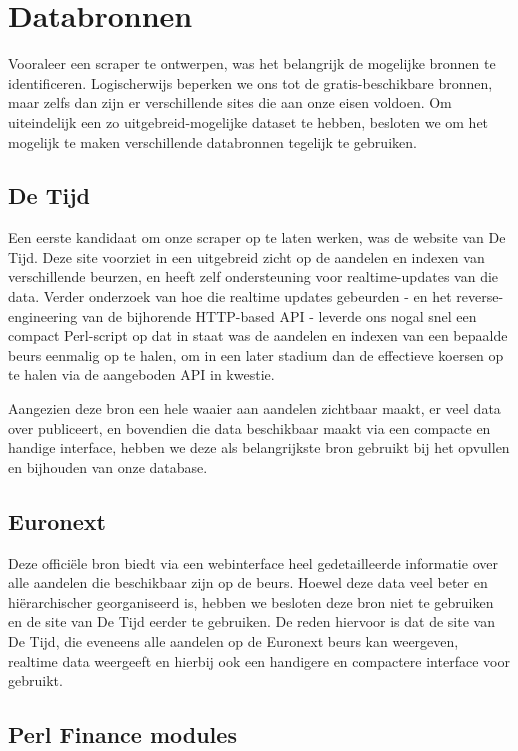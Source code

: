\section{Databronnen}

Vooraleer een scraper te ontwerpen, was het belangrijk de mogelijke bronnen te identificeren. Logischerwijs beperken we ons tot de gratis-beschikbare bronnen, maar zelfs dan zijn er verschillende sites die aan onze eisen voldoen. Om uiteindelijk een zo uitgebreid-mogelijke dataset te hebben, besloten we om het mogelijk te maken verschillende databronnen tegelijk te gebruiken.

\subsection{De Tijd}

Een eerste kandidaat om onze scraper op te laten werken, was de website van De Tijd. Deze site voorziet in een uitgebreid zicht op de aandelen en indexen van verschillende beurzen, en heeft zelf ondersteuning voor realtime-updates van die data. Verder onderzoek van hoe die realtime updates gebeurden - en het reverse-engineering van de bijhorende HTTP-based API - leverde ons nogal snel een compact Perl-script op dat in staat was de aandelen en indexen van een bepaalde beurs eenmalig op te halen, om in een later stadium dan de effectieve koersen op te halen via de aangeboden API in kwestie.

Aangezien deze bron een hele waaier aan aandelen zichtbaar maakt, er veel data over publiceert, en bovendien die data beschikbaar maakt via een compacte en handige interface, hebben we deze als belangrijkste bron gebruikt bij het opvullen en bijhouden van onze database.

\subsection{Euronext}

Deze offici\"ele bron biedt via een webinterface heel gedetailleerde informatie over alle aandelen die beschikbaar zijn op de beurs. Hoewel deze data veel beter en hi\"erarchischer georganiseerd is, hebben we besloten deze bron niet te gebruiken en de site van De Tijd eerder te gebruiken. De reden hiervoor is dat de site van De Tijd, die eveneens alle aandelen op de Euronext beurs kan weergeven, realtime data weergeeft en hierbij ook een handigere en compactere interface voor gebruikt.

\subsection{Perl Finance modules}

